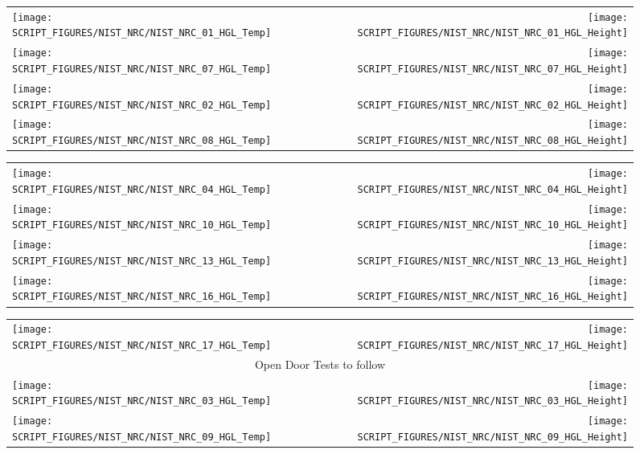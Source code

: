 \begin{figure}[!ht]
\begin{tabular*}{\textwidth}{l@{\extracolsep{\fill}}r}
\texttt{[image: SCRIPT\_FIGURES/NIST\_NRC/NIST\_NRC\_01\_HGL\_Temp]} &
\texttt{[image: SCRIPT\_FIGURES/NIST\_NRC/NIST\_NRC\_01\_HGL\_Height]} \\
\texttt{[image: SCRIPT\_FIGURES/NIST\_NRC/NIST\_NRC\_07\_HGL\_Temp]} &
\texttt{[image: SCRIPT\_FIGURES/NIST\_NRC/NIST\_NRC\_07\_HGL\_Height]} \\
\texttt{[image: SCRIPT\_FIGURES/NIST\_NRC/NIST\_NRC\_02\_HGL\_Temp]} &
\texttt{[image: SCRIPT\_FIGURES/NIST\_NRC/NIST\_NRC\_02\_HGL\_Height]} \\
\texttt{[image: SCRIPT\_FIGURES/NIST\_NRC/NIST\_NRC\_08\_HGL\_Temp]} &
\texttt{[image: SCRIPT\_FIGURES/NIST\_NRC/NIST\_NRC\_08\_HGL\_Height]}
\end{tabular*}
\end{figure}

\begin{figure}[!ht]
\begin{tabular*}{\textwidth}{l@{\extracolsep{\fill}}r}
\texttt{[image: SCRIPT\_FIGURES/NIST\_NRC/NIST\_NRC\_04\_HGL\_Temp]} &
\texttt{[image: SCRIPT\_FIGURES/NIST\_NRC/NIST\_NRC\_04\_HGL\_Height]} \\
\texttt{[image: SCRIPT\_FIGURES/NIST\_NRC/NIST\_NRC\_10\_HGL\_Temp]} &
\texttt{[image: SCRIPT\_FIGURES/NIST\_NRC/NIST\_NRC\_10\_HGL\_Height]} \\
\texttt{[image: SCRIPT\_FIGURES/NIST\_NRC/NIST\_NRC\_13\_HGL\_Temp]} &
\texttt{[image: SCRIPT\_FIGURES/NIST\_NRC/NIST\_NRC\_13\_HGL\_Height]} \\
\texttt{[image: SCRIPT\_FIGURES/NIST\_NRC/NIST\_NRC\_16\_HGL\_Temp]} &
\texttt{[image: SCRIPT\_FIGURES/NIST\_NRC/NIST\_NRC\_16\_HGL\_Height]}
\end{tabular*}
\end{figure}

\clearpage

\begin{figure}[!ht]
\begin{tabular*}{\textwidth}{l@{\extracolsep{\fill}}r}
\texttt{[image: SCRIPT\_FIGURES/NIST\_NRC/NIST\_NRC\_17\_HGL\_Temp]} &
\texttt{[image: SCRIPT\_FIGURES/NIST\_NRC/NIST\_NRC\_17\_HGL\_Height]} \\
\multicolumn{2}{c}{Open Door Tests to follow} \\
\texttt{[image: SCRIPT\_FIGURES/NIST\_NRC/NIST\_NRC\_03\_HGL\_Temp]} &
\texttt{[image: SCRIPT\_FIGURES/NIST\_NRC/NIST\_NRC\_03\_HGL\_Height]} \\
\texttt{[image: SCRIPT\_FIGURES/NIST\_NRC/NIST\_NRC\_09\_HGL\_Temp]} &
\texttt{[image: SCRIPT\_FIGURES/NIST\_NRC/NIST\_NRC\_09\_HGL\_Height]}
\end{tabular*}
\end{figure}

